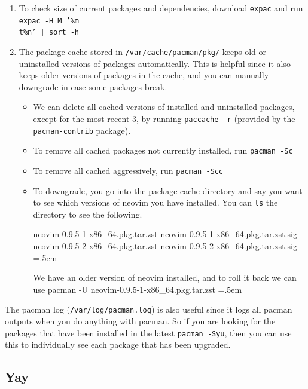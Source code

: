 \documentclass{article}
\theoremstyle{definition}
\newenvironment{cverbatim}
    {\SaveVerbatim{cverb}}
    {\endSaveVerbatim
    \flushleft\fboxrule=0pt\fboxsep=.5em
    \colorbox{cverbbg}{%
      \makebox[\dimexpr\linewidth-2\fboxsep][l]{\BUseVerbatim{cverb}}%
    }
    \endflushleft
  }
\begin{document}
\begin{enumerate}
      \item To check size of current packages and dependencies, download \texttt{expac} and run \texttt{expac -H M '\%m \\t\%n' | sort -h} 

      \item The package cache stored in \texttt{/var/cache/pacman/pkg/} keeps old or uninstalled versions of packages automatically. This is helpful since it also keeps older versions of packages in the cache, and you can manually downgrade in case some packages break.  
      \begin{itemize}
        \item We can delete all cached versions of installed and uninstalled packages, except for the most recent 3, by running \texttt{paccache -r} (provided by the \texttt{pacman-contrib} package). 
        \item To remove all cached packages not currently installed, run \texttt{pacman -Sc}
        \item To remove all cached aggressively, run \texttt{pacman -Scc}
        \item To downgrade, you go into the package cache directory and say you want to see which versions of neovim you have installed. You can \texttt{ls} the directory to see the following. 
        
          \begin{cverbatim}
            neovim-0.9.5-1-x86_64.pkg.tar.zst
            neovim-0.9.5-1-x86_64.pkg.tar.zst.sig
            neovim-0.9.5-2-x86_64.pkg.tar.zst
            neovim-0.9.5-2-x86_64.pkg.tar.zst.sig
          \end{cverbatim}

          We have an older version of neovim installed, and to roll it back we can use 
          \begin{cverbatim} 
            pacman -U neovim-0.9.5-1-x86_64.pkg.tar.zst
          \end{cverbatim}
      \end{itemize} 
    \end{enumerate}

    The pacman log (\texttt{/var/log/pacman.log}) is also useful since it logs all pacman outputs when you do anything with pacman. So if you are looking for the packages that have been installed in the latest \texttt{pacman -Syu}, then you can use this to individually see each package that has been upgraded. 


  \subsection{Yay}
\end{document}

